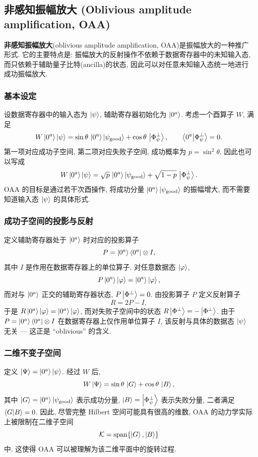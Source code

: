 \documentclass[utf8]{article} %
\numberwithin{equation}{section}   %
\begin{document}
\subsection{非感知振幅放大 (Oblivious amplitude amplification, OAA)}

\textbf{非感知振幅放大}(oblivious amplitude amplification, OAA)是振幅放大的一种推广形式.
它的主要特点是: 振幅放大的反射操作不依赖于数据寄存器中的未知输入态, 
而只依赖于辅助量子比特(ancilla)的状态, 因此可以对任意未知输入态统一地进行成功振幅放大.

\subsubsection{基本设定}

设数据寄存器中的输入态为 $\ket{\psi}$, 辅助寄存器初始化为 $\ket{0^a}$.
考虑一个酉算子 $W$, 满足
\[
    W\ket{0^a}\ket{\psi}
    = \sin\theta\,\ket{0^a}\ket{\psi_{\mathrm{good}}}
    + \cos\theta\,\ket{\Phi^\perp_\psi},
    \qquad \braket{0^a}{\Phi^\perp_\psi} = 0.
\]
第一项对应成功子空间, 第二项对应失败子空间, 成功概率为 $p = \sin^2\theta$.
因此也可以写成
\[
    W\ket{0^a}\ket{\psi}
    = \sqrt{p}\,\ket{0^a}\ket{\psi_{\mathrm{good}}}
    + \sqrt{1-p}\,\ket{\Phi^\perp_\psi}.
\]
OAA 的目标是通过若干次酉操作, 将成功分量 $\ket{0^a}\ket{\psi_{\mathrm{good}}}$ 的振幅增大, 
而不需要知道输入态 $\ket{\psi}$ 的具体形式.

\subsubsection{成功子空间的投影与反射}

定义辅助寄存器处于 $\ket{0^a}$ 时对应的投影算子
\[
    P = \ket{0^a}\bra{0^a} \otimes I,
\]
其中 $I$ 是作用在数据寄存器上的单位算子. 对任意数据态 $\ket{\varphi}$,
\[
    P\ket{0^a}\ket{\varphi} = \ket{0^a}\ket{\varphi},
\]
而对与 $\ket{0^a}$ 正交的辅助寄存器状态, $P\ket{\Phi^\perp} = 0$.
由投影算子 $P$ 定义反射算子
\[
    R = 2P - I,
\]
于是 $R\ket{0^a}\ket{\varphi} = \ket{0^a}\ket{\varphi}$, 而对失败子空间中的状态
$R\ket{\Phi^\perp} = -\ket{\Phi^\perp}$.
由于 $P = \ket{0^a}\bra{0^a}\otimes I$ 在数据寄存器上仅作用单位算子 $I$,
该反射与具体的数据态 $\ket{\psi}$ 无关 --- 这正是 ``oblivious'' 的含义.

\subsubsection{二维不变子空间}

定义 $\ket{\Psi} = \ket{0^a}\ket{\psi}$. 经过 $W$ 后, 
\[
    W\ket{\Psi} = \sin\theta\,\ket{G} + \cos\theta\,\ket{B},
\]
其中 $\ket{G} = \ket{0^a}\ket{\psi_{\mathrm{good}}}$ 表示成功分量, 
$\ket{B} = \ket{\Phi^\perp_\psi}$ 表示失败分量, 二者满足 $\braket{G}{B} = 0$.
因此, 尽管完整 Hilbert 空间可能具有很高的维数, OAA 的动力学实际上被限制在二维子空间
\[
    \mathcal{K} = \mathrm{span}\{\ket{G}, \ket{B}\}
\]
中. 这使得 OAA 可以被理解为该二维平面中的旋转过程.
\end{document}
